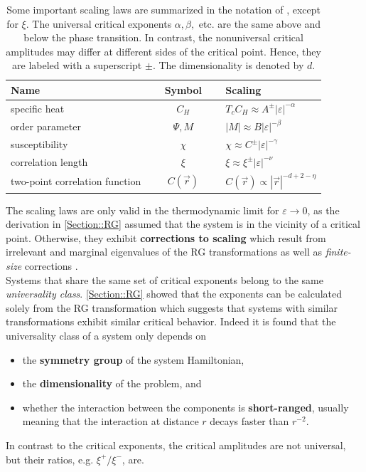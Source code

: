 	\begin{table}[t]
		\centering
		\caption{Some important scaling laws are summarized in the notation of \cite{pelissetto2002critical}, except for $\xi$. The universal critical exponents $\alpha, \beta,$ etc. are the same above and below the phase transition. In contrast, the nonuniversal critical amplitudes may differ at different sides of the critical point. Hence, they are labeled with a superscript $\pm$. The dimensionality is denoted by $d$.}
		\begin{tabular}{l c l}
			\toprule
			Name  & $\quad$ Symbol $\quad$ & Scaling \\
			\midrule
			specific heat & $C_H$ & $T_c C_H \approx A^{\pm} |\varepsilon|^{-\alpha}$ \\
			order parameter & $\Psi, M$ & $|M| \approx B |\varepsilon|^{-\beta}$ \\
			susceptibility & $\chi$ & $\chi \approx C^{\pm} |\varepsilon|^{-\gamma}$ \\
			correlation length & $\xi$ & $\xi \approx \xi^{\pm} |\varepsilon|^{-\nu}$ \\
			two-point correlation function & $C(\vec{r})$& $C(\vec{r}) \propto |\vec{r}|^{- d + 2 - \eta}$ \\
			\bottomrule
		\end{tabular}
		\label{Table::Scaling-Laws}
	\end{table}
	The scaling laws are only valid in the thermodynamic limit for $\varepsilon \rightarrow 0$, as the derivation in \autoref{Section::RG} assumed that the system is in the vicinity of a critical point. Otherwise, they exhibit \textbf{corrections to scaling} \cite{pelissetto2002critical, wegner1972corrections} which result from irrelevant and marginal eigenvalues of the RG transformations as well as \textit{finite-size} corrections \cite{domb1983vol8, goldenfeld2018lectures}. \\
	
	Systems that share the same set of critical exponents belong to the same \textit{universality class}. \autoref{Section::RG} showed that the exponents can be calculated solely from the RG transformation which suggests that systems with similar transformations exhibit similar critical behavior. Indeed it is found that the universality class of a system only depends on
	\begin{itemize}
		\item the \textbf{symmetry group} of the system Hamiltonian,
		\item the \textbf{dimensionality} of the problem, and
		\item whether the {interaction} between the components is \textbf{short-ranged}, usually meaning that the interaction at distance $r$ decays faster than $r^{-2}$.
	\end{itemize}
	In contrast to the critical exponents, the critical amplitudes are not universal, but their ratios, e.g. $\xi^+/\xi^-$, are.\\
	
